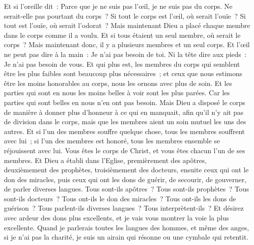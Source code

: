 \begin{multicols}{2}
Et si l'oreille dit~: Parce que je ne suis pas l'œil, je ne suis pas du corps. Ne serait-elle pas pourtant du corps~?
Si tout le corps est l'œil, où serait l'ouïe~? Si tout est l'ouïe, où serait l'odorat~?
Mais maintenant Dieu a placé chaque membre dans le corps comme il a voulu.
Et si tous étaient un seul membre, où serait le corps~?
Mais maintenant donc, il y a plusieurs membres et un seul corps.
Et l'œil ne peut pas dire à la main~: Je n'ai pas besoin de toi. Ni la tête dire aux pieds~: Je n'ai pas besoin de vous.
Et qui plus est, les membres du corps qui semblent être les plus faibles sont beaucoup plus nécessaires~;
et ceux que nous estimons être les moins honorables au corps, nous les ornons avec plus de soin. Et les parties qui sont en nous les moins belles à voir sont les plus parées.
Car les parties qui sont belles en nous n'en ont pas besoin. Mais Dieu a disposé le corps de manière à donner plus d'honneur à ce qui en manquait,
afin qu'il n'y ait pas de division dans le corps, mais que les membres aient un soin mutuel les uns des autres.
Et si l'un des membres souffre quelque chose, tous les membres souffrent avec lui~; si l'un des membres est honoré, tous les membres ensemble se réjouissent avec lui.
Vous êtes le corps de Christ, et vous êtes chacun l'un de ses membres.
Et Dieu a établi dans l'Eglise, premièrement des apôtres, deuxièmement des prophètes, troisièmement des docteurs, ensuite ceux qui ont le don des miracles, puis ceux qui ont les dons de guérir, de secourir, de gouverner, de parler diverses langues.
Tous sont-ils apôtres~? Tous sont-ils prophètes~? Tous sont-ils docteurs~? Tous ont-ils le don des miracles~?
Tous ont-ils les dons de guérison~? Tous parlent-ils diverses langues~? Tous interprètent-ils~?
Et désirez avec ardeur des dons plus excellents, et je vais vous montrer la voie la plus excellente.
\VerseOne{}Quand je parlerais toutes les langues des hommes, et même des anges, si je n'ai pas la charité, je suis un airain qui résonne ou une cymbale qui retentit.

\end{multicols}
